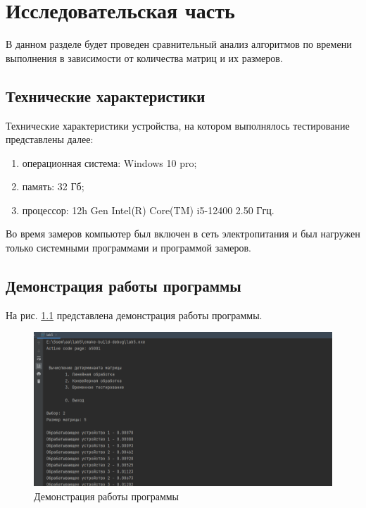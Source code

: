 \chapter{Исследовательская часть}
\hspace{\parindent}В данном разделе будет проведен сравнительный анализ алгоритмов по времени выполнения в зависимости от количества матриц и их размеров.

\section{Технические характеристики}
\hspace{\parindent}Технические характеристики устройства, на котором выполнялось тестирование представлены далее:

\begin{enumerate}
    \item операционная система: Windows 10 pro;
    \item память: 32 Гб;
    \item процессор: 12h Gen Intel(R) Core(TM) i5-12400 2.50 Ггц.
\end{enumerate}
\hspace{\parindent}Во время замеров компьютер был включен в сеть электропитания и был нагружен только системными программами и программой замеров.
\clearpage

\section{Демонстрация работы программы}
\hspace{\parindent}На рис. \ref{fig:demonstration} представлена демонстрация работы программы. 

\begin{figure}[h]
	\centering
	\includegraphics[height=0.5\textheight]{img/ex.png}
	\caption{Демонстрация работы программы}
	\label{fig:demonstration}
\end{figure}

